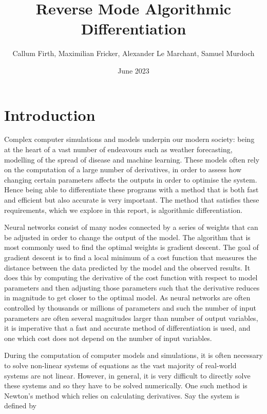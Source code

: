 \documentclass{article}
\title{Reverse Mode Algorithmic Differentiation}
\author{Callum Firth, Maximilian Fricker, Alexander Le Marchant, Samuel Murdoch} %
\date{June 2023}
\begin{document}
\maketitle

\tableofcontents


\section{Introduction}

Complex computer simulations and models underpin our modern society: being at the heart of a vast number of endeavours such as weather forecasting, modelling of the spread of disease and machine learning. These models often rely on the computation of a large number of derivatives, in order to assess how changing certain parameters affects the outputs in order to optimise the system. Hence being able to differentiate these programs with a method that is both fast and efficient but also accurate is very important. The method that satisfies these requirements, which we explore in this report, is algorithmic differentiation.

Neural networks consist of many nodes connected by a series of weights that can be adjusted in order to change the output of the model. The algorithm that is most commonly used to find the optimal weights is gradient descent. The goal of gradient descent is to find a local minimum of a cost function that measures the distance between the data predicted by the model and the observed results. It does this by computing the derivative of the cost function with respect to model parameters and then adjusting those parameters such that the derivative reduces in magnitude to get closer to the optimal model. As neural networks are often controlled by thousands or millions of parameters and such the number of input parameters are often several magnitudes larger than number of output variables, it is imperative that a fast and accurate method of differentiation is used, and one which cost does not depend on the number of input variables.

During the computation of computer models and simulations, it is often necessary to solve non-linear systems of equations as the vast majority of real-world systems are not linear. However, in general, it is very difficult to directly solve these systems and so they have to be solved numerically. One such method is Newton's method which relies on calculating derivatives. Say the system is defined by
\end{document}
